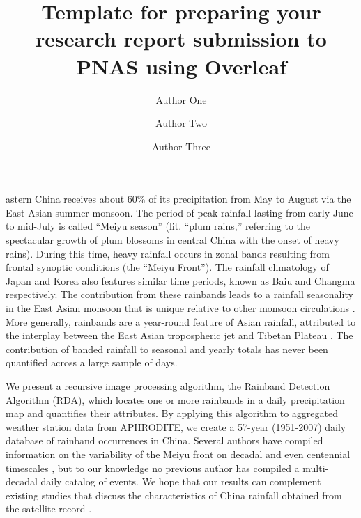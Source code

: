 \documentclass[9pt,twocolumn,twoside,lineno]{pnas-new}
\title{Template for preparing your research report submission to PNAS using Overleaf}
\author[a,c,1]{Author One}
\author[b,1,2]{Author Two}
\author[a]{Author Three}
\affil[a]{Affiliation One}
\affil[b]{Affiliation Two}
\affil[c]{Affiliation Three}
\begin{document}
\verticaladjustment{-2pt}

\maketitle
\thispagestyle{firststyle}

astern China receives about 60\% of its precipitation from May to August via the East Asian summer monsoon. The period of peak rainfall lasting from early June to mid-July is called ``Meiyu season'' (lit. ``plum rains,'' referring to the spectacular growth of plum blossoms in central China with the onset of heavy rains). During this time, heavy rainfall occurs in zonal bands resulting from frontal synoptic conditions (the ``Meiyu Front''). The rainfall climatology of Japan and Korea also features similar time periods, known as Baiu and Changma respectively. The contribution from these rainbands leads to a rainfall seasonality in the East Asian monsoon that is unique relative to other monsoon circulations \citep{Ding2005}. More generally, rainbands are a year-round feature of Asian rainfall, attributed to the interplay between the East Asian tropospheric jet and Tibetan Plateau \citep{Molnar2010,Sampe2010,Chen2014}. The contribution of banded rainfall to seasonal and yearly totals has never been quantified across a large sample of days.
		
	We present a recursive image processing algorithm, the Rainband Detection Algorithm (RDA), which locates one or more rainbands in a daily precipitation map and quantifies their attributes. By applying this algorithm to aggregated weather station data from APHRODITE, we create a 57-year (1951-2007) daily database of rainband occurrences in China. Several authors have compiled information on the variability of the Meiyu front on decadal and even centennial timescales \citep{Chen2004,Ge2008,Xu2009}, but to our knowledge no previous author has compiled a multi-decadal daily catalog of events. We hope that our results can complement existing studies that discuss the characteristics of China rainfall obtained from the satellite record \citep{Luo2009,Luo2011,Luo2013}.
	
\end{document}
